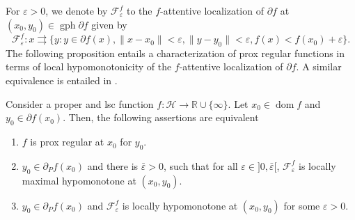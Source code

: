 \documentclass[smallextended,envcountsect,envcountsame]{svjour3}
\renewcommand{\H}{\mathcal{H}}
\newcommand{\R}{\mathbb{R}}
\newcommand{\tto}{\rightrightarrows}
\newcommand{\gph}{\operatorname{gph}}
\newcommand{\dom}{\operatorname{dom}}
\renewcommand{\epsilon}{\varepsilon}
\newcommand{\1}{\mathds{1}}
\begin{document}
	For $\epsilon>0$, we denote by $\mathscr{F}_\epsilon^f$ to the $f$-attentive localization of $\partial f$ at $(x_0,y_0)\in \gph \partial f$ given by 
	\begin{equation*}
		\mathscr{F}_\epsilon^f \colon x\tto \{y: y\in \partial f(x), \|x-x_0\|<\epsilon, \|y-y_0\|<\epsilon, f(x)<f(x_0)+\epsilon\}.
	\end{equation*}
	The following proposition entails a characterization of prox regular functions in terms of local hypomonotonicity of the $f$-attentive localization of $\partial f$. A similar equivalence is entailed in \cite[Theorem 1]{Rockafellar2025-2}.
	\begin{proposition}\label{prop-prox-reg}
		Consider a proper and lsc function $f\colon \H\to \R\cup\{\infty\}$. Let $x_0\in \dom f$ and $y_0\in \partial f(x_0)$. Then, the following assertions are equivalent
		\begin{enumerate}
			\item [(a)] $f$ is prox regular at $x_0$ for $y_0$.
			\item [(b)] $y_0\in \partial_P f(x_0)$ and there is $\bar\epsilon>0$, such that for all $\epsilon\in ]0,\bar \epsilon[$, $\mathscr{F}_\epsilon^f$ is locally maximal hypomonotone at $(x_0,y_0)$.
			\item [(c)] $y_0\in \partial_P f(x_0)$ and $\mathscr{F}_\epsilon^f$ is locally hypomonotone at $(x_0,y_0)$ for some $\epsilon>0$.
		\end{enumerate}
	\end{proposition}
\end{document}

